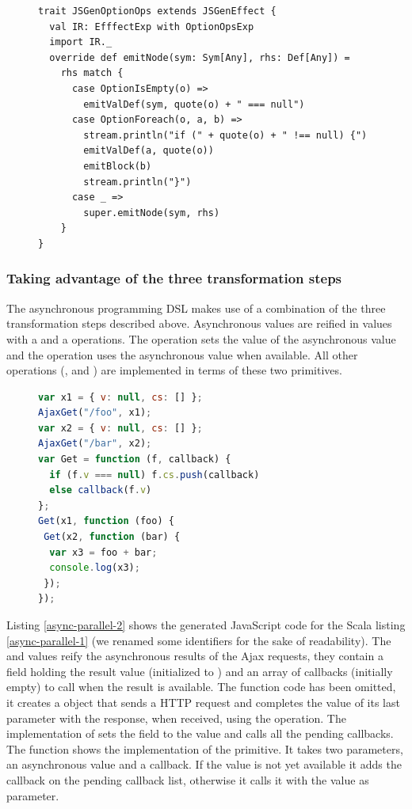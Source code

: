 \documentclass[american,english,runningheads]{llncs}
\begin{document}
\begin{figure}
\begin{lstlisting}[caption=Null reference handling DSL code generator,label=option-codegen]
trait JSGenOptionOps extends JSGenEffect {
  val IR: EfffectExp with OptionOpsExp
  import IR._
  override def emitNode(sym: Sym[Any], rhs: Def[Any]) =
    rhs match {
      case OptionIsEmpty(o) =>
        emitValDef(sym, quote(o) + " === null")
      case OptionForeach(o, a, b) =>
        stream.println("if (" + quote(o) + " !== null) {")
        emitValDef(a, quote(o))
        emitBlock(b)
        stream.println("}")
      case _ =>
        super.emitNode(sym, rhs)
    }
}
\end{lstlisting}
\end{figure}

\subsubsection{Taking advantage of the three transformation steps}

The asynchronous programming DSL makes use of a combination of the three transformation steps described above.
Asynchronous values are reified in values with a  and a  operations. The  operation
sets the value of the asynchronous value and the  operation uses the asynchronous value when available.
All other operations (,  and ) are implemented in terms of these two primitives.

\begin{figure}
\begin{lstlisting}[language=JavaScript,caption={Generated JavaScript code for listing \protect\ref{async-parallel-1}},label=async-parallel-2]
var x1 = { v: null, cs: [] };
AjaxGet("/foo", x1);
var x2 = { v: null, cs: [] };
AjaxGet("/bar", x2);
var Get = function (f, callback) {
  if (f.v === null) f.cs.push(callback)
  else callback(f.v)
};
Get(x1, function (foo) {
 Get(x2, function (bar) {
  var x3 = foo + bar;
  console.log(x3);
 });
});
\end{lstlisting}
\end{figure}

Listing \ref{async-parallel-2} shows the generated JavaScript code for the Scala listing \ref{async-parallel-1} (we
renamed some identifiers for the sake of readability). The  and  values reify the asynchronous
results of the Ajax requests, they contain a field  holding the result value (initialized to ) and an
array of callbacks  (initially empty) to call when the result is available. The  function code
has been omitted, it creates a  object that sends a HTTP request and completes the value of its
last parameter with the response, when received, using the  operation. The implementation of  sets
the  field to the value and calls all the pending  callbacks. The  function shows the
implementation of the  primitive. It takes two parameters, an asynchronous value and a callback. If the value
is not yet available it adds the callback on the pending callback list, otherwise it calls it with the value as
parameter.
\end{document}
